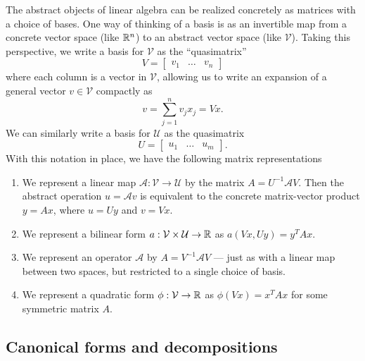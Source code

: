 \documentclass[12pt, leqno]{article} %
\begin{document}
The abstract objects of linear algebra can be realized concretely
as matrices with a choice of bases.  One way of thinking of a basis
is as an invertible map from a concrete vector space (like $\mathbb{R}^n$)
to an abstract vector space (like $\mathcal{V}$).  Taking this
perspective, we write a basis for $\mathcal{V}$ as the
``quasimatrix''
\[
  V = \begin{bmatrix} v_1 & \ldots &v_n \end{bmatrix}
\]
where each column is a vector in $\mathcal{V}$, allowing us to write
an expansion of a general vector $v \in \mathcal{V}$ compactly as
\[
  v = \sum_{j=1}^n v_j x_j = Vx.
\]
We can similarly write a basis for $\mathcal{U}$ as the quasimatrix
\[
  U = \begin{bmatrix} u_1 & \ldots &u_m \end{bmatrix}.
\]
With this notation in place, we have the following matrix
representations
\begin{enumerate}
\item We represent a linear map $\mathcal{A} : \mathcal{V} \rightarrow
  \mathcal{U}$ by the matrix $A = U^{-1} \mathcal{A} V$.  Then the abstract
  operation $u = \mathcal{A} v$ is equivalent to the concrete
  matrix-vector product $y = Ax$, where $u = Uy$ and $v = Vx$.
\item We represent a bilinear form $a : \mathcal{V} \times \mathcal{U}
  \rightarrow \mathbb{R}$ as $a(Vx, Uy) = y^T A x$.
\item We represent an operator $\mathcal{A}$ by
  $A = V^{-1} \mathcal{A} V$ --- just as with a linear map between two
  spaces, but restricted to a single choice of basis.
\item We represent a quadratic form $\phi : \mathcal{V} \rightarrow \mathbb{R}$
  as $\phi(Vx) = x^T A x$ for some symmetric matrix $A$.
\end{enumerate}

\subsection{Canonical forms and decompositions}
\end{document}
